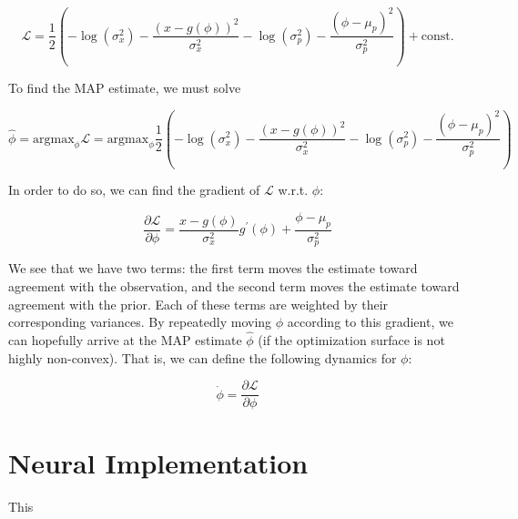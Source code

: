 \begin{equation}
	\mathcal{L} = \frac{1}{2} \left( - \log ( \sigma_x^2 )  - \frac{(x - g(\phi))^2}{\sigma_x^2} - \log ( \sigma_p^2 ) -\frac{(\phi - \mu_p)^2}{\sigma_p^2} \right) + \text{const.}
\end{equation}

\noindent To find the MAP estimate, we must solve

\begin{equation}
	\hat{\phi} = \text{argmax}_\phi \mathcal{L} =  \text{argmax}_\phi \frac{1}{2} \left( - \log ( \sigma_x^2 )  - \frac{(x - g(\phi))^2}{\sigma_x^2} - \log ( \sigma_p^2 ) -\frac{(\phi - \mu_p)^2}{\sigma_p^2} \right)
\end{equation}

\noindent In order to do so, we can find the gradient of $\mathcal{L}$ w.r.t. $\phi$:

\begin{equation}
	\frac{\partial \mathcal{L}}{\partial \phi} = \frac{x - g(\phi)}{\sigma_x^2} g^\prime (\phi) + \frac{\phi - \mu_p}{\sigma_p^2}
\end{equation}

\noindent We see that we have two terms: the first term moves the estimate toward agreement with the observation, and the second term moves the estimate toward agreement with the prior. Each of these terms are weighted by their corresponding variances. By repeatedly moving $\phi$ according to this gradient, we can hopefully arrive at the MAP estimate $\hat{\phi}$ (if the optimization surface is not highly non-convex). That is, we can define the following dynamics for $\phi$:

\begin{equation}
	\dot{\phi} = \frac{\partial \mathcal{L}}{\partial \phi}
\end{equation}

\section{Neural Implementation}

This 


